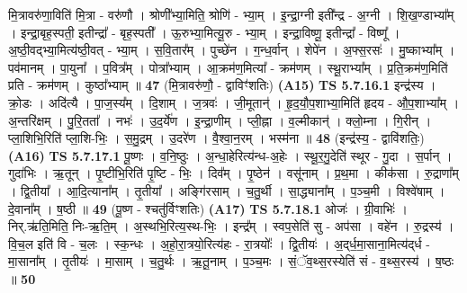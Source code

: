 \documentclass[17pt]{extarticle}
\begin{document}
                  मि॒त्रावरु॑णा॒विति॑ मि॒त्रा - वरु॑णौ । श्रोणी᳚भ्या॒मिति॒ श्रोणि॑ - भ्या॒म् । इ॒न्द्रा॒ग्नी इती᳚न्द्र - अ॒ग्नी । शि॒ख॒ण्डाभ्या᳚म् । इन्द्रा॒बृह॒स्पती॒ इतीन्द्रा᳚ - बृह॒स्पती᳚ । ऊ॒रुभ्या॒मित्यू॒रु - भ्या॒म् । इन्द्रा॒विष्णू॒ इतीन्द्रा᳚ - विष्णू᳚ । अ॒ष्ठी॒वद्भ्या॒मित्य॑ष्ठी॒वत् - भ्या॒म् । स॒वि॒तार᳚म् । पुच्छे॑न । ग॒न्ध॒र्वान् । शेपे॑न । अ॒फ्स॒रसः॑ । मु॒ष्काभ्या᳚म् । पव॑मानम् । पा॒युना᳚ । प॒वित्र᳚म् । पोत्रा᳚भ्याम् । आ॒क्रम॑ण॒मित्या᳚ - क्रम॑णम् । स्थू॒राभ्या᳚म् । प्र॒ति॒क्रम॑ण॒मिति॑ प्रति - क्रम॑णम् । कुष्ठा᳚भ्याम् ॥ \textbf{  47} \newline
                  \newline
                      (मि॒त्रावरु॑णौ॒ - द्वाविꣳ॑शतिः)  \textbf{(A15)} \newline \newline
                                \textbf{ TS 5.7.16.1} \newline
                  इन्द्र॑स्य । क्रो॒डः । अदि॑त्यै । पा॒ज॒स्य᳚म् । दि॒शाम् । ज॒त्रवः॑ । जी॒मूतान्॑ । हृ॒द॒यौ॒प॒शाभ्या॒मिति॑ हृदय - औ॒प॒शाभ्या᳚म् । अ॒न्तरि॑क्षम् । पु॒रि॒तता᳚ । नभः॑ । उ॒द॒र्ये॑ण । इ॒न्द्रा॒णीम् । प्ली॒ह्ना । व॒ल्मीकान्॑ । क्लो॒म्ना । गि॒रीन् । प्ला॒शिभि॒रिति॑ प्ला॒शि-भिः॒ । स॒मु॒द्रम् । उ॒दरे॑ण । वै॒श्वा॒न॒रम् । भस्म॑ना ॥ \textbf{  48} \newline
                  \newline
                      (इन्द्र॑स्य॒ - द्वावि॑शतिः॒)  \textbf{(A16)} \newline \newline
                                \textbf{ TS 5.7.17.1} \newline
                  पू॒ष्णः । व॒नि॒ष्ठुः । अ॒न्धा॒हेरित्य॑न्ध-अ॒हेः । स्थू॒र॒गु॒देति॑ स्थूर - गु॒दा । स॒र्पान् । गुदा॑भिः । ऋ॒तून् । पृ॒ष्टीभि॒रिति॑ पृ॒ष्टि - भिः॒ । दिव᳚म् । पृ॒ष्ठेन॑ । वसू॑नाम् । प्र॒थ॒मा । कीक॑सा । रु॒द्राणा᳚म् । द्वि॒तीया᳚ । आ॒दि॒त्याना᳚म् । तृ॒तीया᳚ । अङ्गि॑रसाम् । च॒तु॒र्थी । सा॒द्ध्याना᳚म् । प॒ञ्च॒मी । विश्वे॑षाम् । दे॒वाना᳚म् । ष॒ष्ठी ॥ \textbf{  49} \newline
                  \newline
                      (पू॒ष्ण - श्चतु॑र्विꣳशतिः)  \textbf{(A17)} \newline \newline
                                \textbf{ TS 5.7.18.1} \newline
                  ओजः॑ । ग्री॒वाभिः॑ । निर्.ऋ॑ति॒मिति॒ निः-ऋ॒ति॒म् । अ॒स्थभि॒रित्य॒स्थ-भिः॒ । इन्द्र᳚म् । स्वप॒सेति॑ सु - अप॑सा । वहे॑न । रु॒द्रस्य॑ । वि॒च॒ल इति॑ वि - च॒लः । स्क॒न्धः । अ॒हो॒रा॒त्रयो॒रित्य॑हः - रा॒त्रयोः᳚ । द्वि॒तीयः॑ । अ॒द्‌र्ध॒मा॒साना॒मित्य॑द्‌र्ध - मा॒साना᳚म् । तृ॒तीयः॑ । मा॒साम् । च॒तु॒र्थः । ऋ॒तू॒नाम् । प॒ञ्च॒मः । सं॒ॅव॒थ्स॒रस्येति॑ सं - व॒थ्स॒रस्य॑ । ष॒ष्ठः ॥ \textbf{  50} \newline
\end{document}
